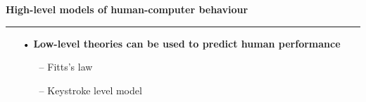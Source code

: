 \documentclass[pdf]{beamer}
\begin{document}
\begin{frame}
\vspace{8mm}
\textcolor{myBlue}{\textbf{\Large{High-level models of human-computer behaviour}}}

\textcolor{red}{\rule{10cm}{1mm}}

\begin{itemize}
\item[\textcolor{black}{•}] \textbf{Low-level theories can be used to predict human performance}
	\begin{itemize}
	\item[\textcolor{black}{--}] Fitts’s law
		\begin{itemize}
		\end{itemize}
	\item[\textcolor{black}{--}] Keystroke level model 
		\begin{itemize}
        \end{itemize}
\end{itemize}
\end{itemize}
\end{frame}
\end{document}

